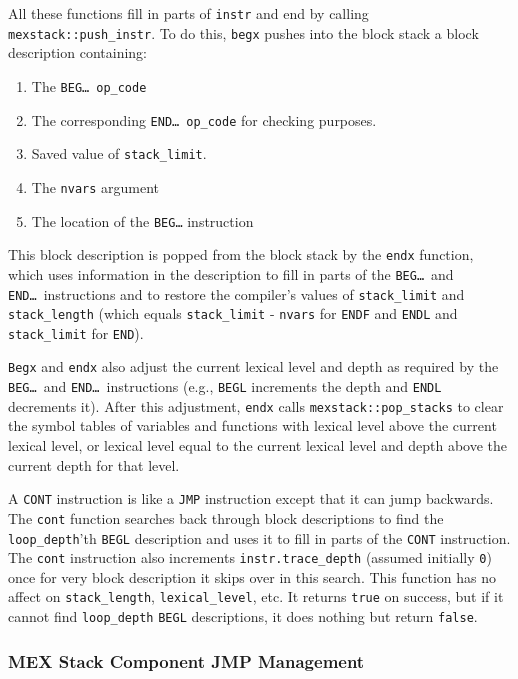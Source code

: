 \documentclass[12pt]{article}
\newenvironment{indpar}[1][0.3in]%
	{\begin{list}{}%
		     {\setlength{\itemsep}{0in}%
		      \setlength{\topsep}{0in}%
		      \setlength{\parsep}{1ex}%
		      \setlength{\labelwidth}{#1}%
		      \setlength{\leftmargin}{#1}%
		      \addtolength{\leftmargin}{\labelsep}}%
	 \item}%
	{\end{list}}
\begin{document}
\begin{indpar}
All these functions fill in parts of {\tt instr} and end by calling
{\tt mexstack::push\_instr}.  To do this, {\tt begx} pushes into the
block stack\label{BLOCK-STACK} a block description containing:
\begin{enumerate}
\item The {\tt BEG\ldots}~{\tt op\_code}
\item The corresponding {\tt END\ldots}~{\tt op\_code} for checking purposes.
\item Saved value of {\tt stack\_limit}.
\item The {\tt nvars} argument
\item The location of the {\tt BEG\ldots} instruction
\end{enumerate}
This block description is popped from the block stack by the {\tt endx}
function, which uses information in the description to fill in parts of the
{\tt BEG\ldots}~and {\tt END\ldots}~instructions and to restore the compiler's
values of {\tt stack\_limit} and {\tt stack\_length} (which equals
{\tt stack\_limit} - {\tt nvars} for {\tt ENDF} and {\tt ENDL}
and {\tt stack\_limit} for {\tt END}).

{\tt Begx} and {\tt endx} also adjust the current lexical level and
depth as required by the {\tt BEG\ldots}~and {\tt END\ldots}~instructions
(e.g., {\tt BEGL} increments the depth and {\tt ENDL} decrements it).
After this adjustment, {\tt endx} calls {\tt mexstack::pop\_stacks}
to clear the symbol tables of variables and functions with
lexical level above the current lexical level, or lexical level
equal to the current lexical level and depth above the current depth
for that level.

A {\tt CONT} instruction is like a {\tt JMP} instruction except that it can
jump backwards.
The {\tt cont} function searches back through block descriptions to find
the {\tt loop\_depth}'th {\tt BEGL} description and uses it
to fill in parts of the {\tt CONT} instruction.  The {\tt cont} instruction
also increments {\tt instr.trace\_depth} (assumed initially {\tt 0})
once for very block description
it skips over in this search.
This function has no affect on {\tt stack\_length}, {\tt lexical\_level},
etc.
It returns {\tt true} on success,
but if it cannot find {\tt loop\_depth} {\tt BEGL} descriptions, it does
nothing but return {\tt false}.
\end{indpar}


\subsubsection{MEX Stack Component JMP Management}
\label{MEX-STACK-COMPONENT-JMP-MANAGEMENT}
\end{document}
